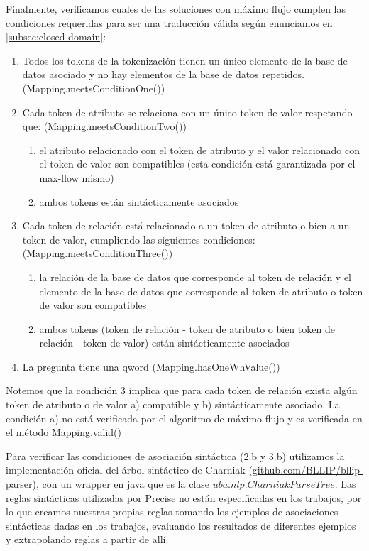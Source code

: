 Finalmente, verificamos cuales de las soluciones con máximo flujo cumplen las condiciones requeridas para ser una traducción válida según enunciamos en \ref{subsec:closed-domain}:

\begin{enumerate}
\item Todos  los tokens de la tokenización tienen un único elemento de la base de datos asociado y no hay elementos de la base de datos repetidos. (Mapping.meetsConditionOne())
\item Cada token de atributo se relaciona con un único token de valor respetando que: (Mapping.meetsConditionTwo())
\begin{enumerate}
\item el atributo relacionado con el token de atributo y el valor relacionado con el token de valor son compatibles (esta condición está garantizada por el max-flow mismo)
\item ambos tokens están sintácticamente asociados
\end{enumerate}
\item Cada token de relación está relacionado a un token de atributo o bien a un token de valor, cumpliendo las siguientes condiciones: (Mapping.meetsConditionThree())
\begin{enumerate}
\item	la relación de la base de datos que corresponde al token de relación y el elemento de la base de datos que corresponde al token de atributo o token de valor son compatibles
\item ambos tokens (token de relación - token de atributo o bien token de relación - token de valor) están sintácticamente asociados
\end{enumerate}
\item La pregunta tiene una qword (Mapping.hasOneWhValue())
\end{enumerate}

Notemos que la condición 3 implica que para cada token de relación exista algún token de atributo o de valor a) compatible y b) sintácticamente asociado. La condición a) no está verificada por el algoritmo de máximo flujo y es verificada en el método Mapping.valid()

Para verificar las condiciones de asociación sintáctica (2.b y 3.b) utilizamos la implementación oficial del árbol sintáctico de Charniak (\url{github.com/BLLIP/bllip-parser}), con un wrapper en java que es la clase $uba.nlp.CharniakParseTree$. Las reglas sintácticas utilizadas por Precise no están especificadas en los trabajos, por lo que creamos nuestras propias reglas tomando los ejemplos de asociaciones sintácticas dadas en los trabajos, evaluando los resultados de diferentes ejemplos y extrapolando reglas a partir de allí.



